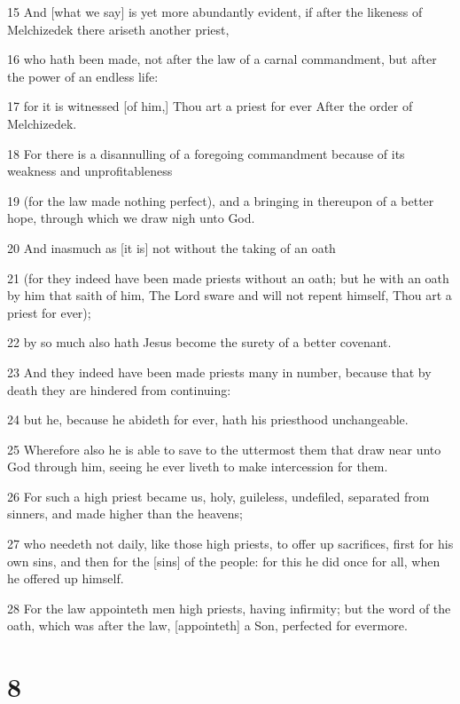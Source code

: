 \par 15 And [what we say] is yet more abundantly evident, if after the likeness of Melchizedek there ariseth another priest,
\par 16 who hath been made, not after the law of a carnal commandment, but after the power of an endless life:
\par 17 for it is witnessed [of him,] Thou art a priest for ever After the order of Melchizedek.
\par 18 For there is a disannulling of a foregoing commandment because of its weakness and unprofitableness
\par 19 (for the law made nothing perfect), and a bringing in thereupon of a better hope, through which we draw nigh unto God.
\par 20 And inasmuch as [it is] not without the taking of an oath
\par 21 (for they indeed have been made priests without an oath; but he with an oath by him that saith of him, The Lord sware and will not repent himself, Thou art a priest for ever);
\par 22 by so much also hath Jesus become the surety of a better covenant.
\par 23 And they indeed have been made priests many in number, because that by death they are hindered from continuing:
\par 24 but he, because he abideth for ever, hath his priesthood unchangeable.
\par 25 Wherefore also he is able to save to the uttermost them that draw near unto God through him, seeing he ever liveth to make intercession for them.
\par 26 For such a high priest became us, holy, guileless, undefiled, separated from sinners, and made higher than the heavens;
\par 27 who needeth not daily, like those high priests, to offer up sacrifices, first for his own sins, and then for the [sins] of the people: for this he did once for all, when he offered up himself.
\par 28 For the law appointeth men high priests, having infirmity; but the word of the oath, which was after the law, [appointeth] a Son, perfected for evermore.

\chapter{8}

